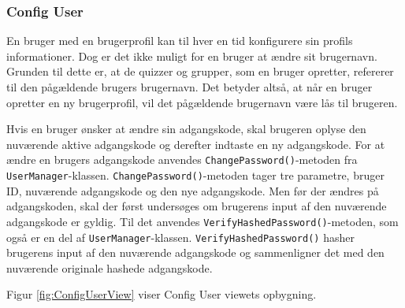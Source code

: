 \subsubsection{Config User}

En bruger med en brugerprofil kan til hver en tid konfigurere sin profils informationer. Dog er det ikke muligt for en bruger at ændre sit brugernavn. Grunden til dette er, at de quizzer og grupper, som en bruger opretter, refererer til den pågældende brugers brugernavn. Det betyder altså, at når en bruger opretter en ny brugerprofil, vil det pågældende brugernavn være lås til brugeren. 

Hvis en bruger ønsker at ændre sin adgangskode, skal brugeren oplyse den nuværende aktive adgangskode og derefter indtaste en ny adgangskode. For at ændre en brugers adgangskode anvendes \verb+ChangePassword()+-metoden fra \verb+UserManager+-klassen. \verb+ChangePassword()+-metoden tager tre parametre, bruger ID, nuværende adgangskode og den nye adgangskode. Men før der ændres på adgangskoden, skal der først undersøges om brugerens input af den nuværende adgangskode er gyldig. Til det anvendes \verb+VerifyHashedPassword()+-metoden, som også er en del af \verb+UserManager+-klassen. \verb+VerifyHashedPassword()+ hasher brugerens input af den nuværende adgangskode og sammenligner det med den nuværende originale hashede adgangskode. 

Figur \ref{fig:ConfigUserView} viser Config User viewets opbygning. 

